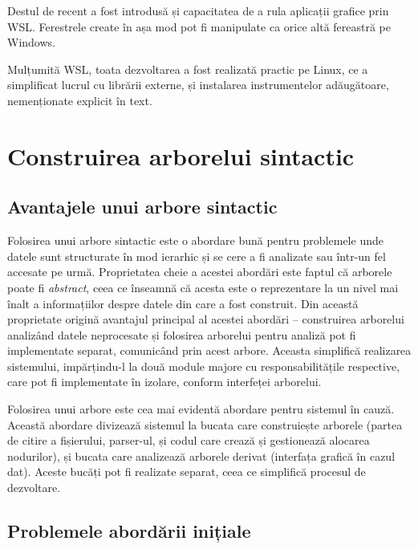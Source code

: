 \documentclass[a4paper,12pt]{report}
\begin{document}
Destul de recent a fost introdusă și capacitatea de a rula aplicații grafice prin \ac{WSL}.
Ferestrele create în așa mod pot fi manipulate ca orice altă fereastră pe Windows.

Mulțumită \ac{WSL}, toata dezvoltarea a fost realizată practic pe Linux, 
ce a simplificat lucrul cu librării externe, și instalarea instrumentelor adăugătoare, nemenționate explicit în text.

\section{Construirea arborelui sintactic}

\subsection{Avantajele unui arbore sintactic}

Folosirea unui arbore sintactic este o abordare bună pentru problemele 
unde datele sunt structurate în mod ierarhic și se cere a fi analizate sau într-un fel accesate pe urmă.
Proprietatea cheie a acestei abordări este faptul că arborele poate fi \textit{abstract},
ceea ce înseamnă că acesta este o reprezentare la un nivel mai înalt a informațiilor despre datele
din care a fost construit.
Din această proprietate origină avantajul principal al acestei abordări --
construirea arborelui analizând datele neprocesate și folosirea arborelui
pentru analiză pot fi implementate separat, comunicând prin acest arbore.
Aceasta simplifică realizarea sistemului, impărțindu-l la două module majore cu responsabilitățile respective,
care pot fi implementate în izolare, conform interfeței arborelui.

Folosirea unui arbore este cea mai evidentă abordare pentru sistemul în cauză.
Această abordare divizează sistemul la bucata care construiește arborele
(partea de citire a fișierului, parser-ul, și codul care crează și gestionează alocarea nodurilor),
și bucata care analizează arborele derivat (interfața grafică în cazul dat).
Aceste bucăți pot fi realizate separat, ceea ce simplifică procesul de dezvoltare.

\subsection{Problemele abordării inițiale}
\end{document}
